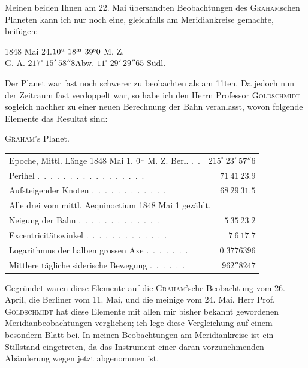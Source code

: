 Meinen beiden Ihnen am 22. Mai übersandten Beobachtungen des \textsc{Graham}schen Planeten kann ich nur noch eine, gleichfalls am Meridiankreise gemachte, beifügen:

\begin{center}
1848 Mai 24.\quad $10^{\rm u}\ 18^{\rm m}\ 39^{\rm s}0$ M. Z.\\
G. A. $217^\circ\ 15'\ 58''8$\qquad Abw. $11^\circ\ 29'\ 29''65$ Südl.
\end{center}

Der Planet war fast noch schwerer zu beobachten als am 11ten. Da jedoch nun der Zeitraum fast verdoppelt war, so habe ich den Herrn Professor \textsc{Goldschmidt} sogleich nachher zu einer neuen Berechnung der Bahn veranlasst, wovon folgende Elemente das Resultat sind:

\begin{center}
\textsc{Graham}'s Planet.\\[3pt]
\small
\setlength{\tabcolsep}{3pt}
\begin{tabular}{lr}
Epoche, Mittl. Länge 1848 Mai 1. $0^{\rm u}$ M. Z. Berl. \mbox{.\ .} & $215^\circ\ 23'\ 57''6$ \\
Perihel \mbox{.\ .\ .\ .\ .\ .\ .\ .\ .\ .\ .\ .\ .\ .\ .\ .\ .} & $71\ 41\ 23.9$ \\
Aufsteigender Knoten \mbox{.\ .\ .\ .\ .\ .\ .\ .\ .\ .\ .\ .} & $68\ 29\ 31.5$ \\
\multicolumn{2}{l}{\quad Alle drei vom mittl. Aequinoctium 1848 Mai 1 gezählt.} \\
Neigung der Bahn \mbox{.\ .\ .\ .\ .\ .\ .\ .\ .\ .\ .\ .\ .} & $5\ 35\ 23.2$ \\
Excentricitätswinkel \mbox{.\ .\ .\ .\ .\ .\ .\ .\ .\ .\ .\ .\ .} & $7\ 6\ 17.7$ \\
Logarithmus der halben grossen Axe \mbox{.\ .\ .\ .\ .\ .\ .} & $0.3776396$ \\
Mittlere tägliche siderische Bewegung \mbox{.\ .\ .\ .\ .\ .} & $962''8247$ \\
\end{tabular}
\end{center}

Gegründet waren diese Elemente auf die \textsc{Graham}'sche Beobachtung vom 26. April, die Berliner vom 11. Mai, und die meinige vom 24. Mai. Herr Prof. \textsc{Goldschmidt} hat diese Elemente mit allen mir bisher bekannt gewordenen Meridianbeobachtungen verglichen; ich lege diese Vergleichung auf einem besondern Blatt bei. In meinen Beobachtungen am Meridiankreise ist ein Stillstand eingetreten, da das Instrument einer daran vorzunehmenden Abänderung wegen jetzt abgenommen ist.
\par{}
